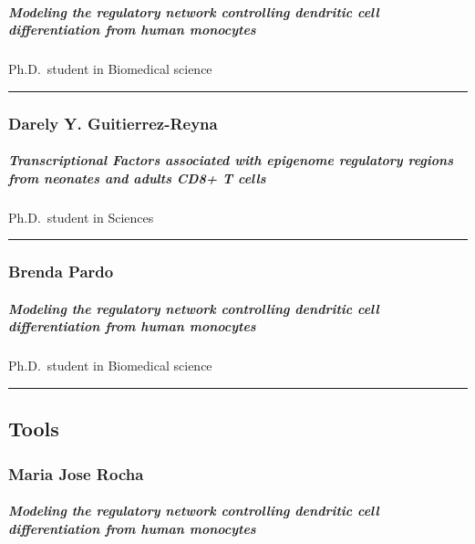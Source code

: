 \documentclass[]{article}
\let\oldsubparagraph\subparagraph
\renewcommand{\subparagraph}[1]{\oldsubparagraph{#1}\mbox{}}
\begin{document}
\subparagraph{ Modeling the regulatory network controlling dendritic
cell differentiation from human
monocytes}\label{modeling-the-regulatory-network-controlling-dendritic-cell-differentiation-from-human-monocytes-1}

Ph.D.~student in Biomedical science

\begin{center}\rule{0.5\linewidth}{\linethickness}\end{center}

\subsubsection{Darely Y.
Guitierrez-Reyna}\label{darely-y.-guitierrez-reyna}

\subparagraph{ Transcriptional Factors associated with epigenome
regulatory regions from neonates and adults CD8+ T
cells}\label{transcriptional-factors-associated-with-epigenome-regulatory-regions-from-neonates-and-adults-cd8-t-cells}

Ph.D.~student in Sciences

\begin{center}\rule{0.5\linewidth}{\linethickness}\end{center}

\subsubsection{Brenda Pardo}\label{brenda-pardo}

\subparagraph{ Modeling the regulatory network controlling dendritic
cell differentiation from human
monocytes}\label{modeling-the-regulatory-network-controlling-dendritic-cell-differentiation-from-human-monocytes-2}

Ph.D.~student in Biomedical science

\begin{center}\rule{0.5\linewidth}{\linethickness}\end{center}

\subsection{Tools}\label{tools}

\subsubsection{Maria Jose Rocha}\label{maria-jose-rocha}

\subparagraph{ Modeling the regulatory network controlling dendritic
cell differentiation from human
monocytes}\label{modeling-the-regulatory-network-controlling-dendritic-cell-differentiation-from-human-monocytes-3}
\end{document}
